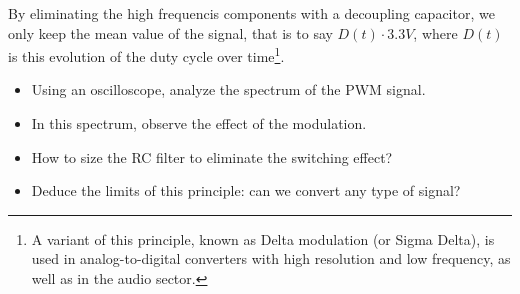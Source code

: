 \documentclass[11pt,a4paper]{article}
\theoremstyle{definition}%
\begin{document}
By eliminating the high frequencis components with a decoupling capacitor, we only keep the mean value of the signal, that is to say $D(t) \cdot 3.3V$, where $D(t)$ is this evolution of the duty cycle over time\footnote{A variant of this principle, known as Delta modulation (or Sigma Delta), is used in analog-to-digital converters with high resolution and low frequency, as well as in the audio sector.}.

\begin{itemize}
	\item Using an oscilloscope, analyze the spectrum of the PWM signal.
	\item In this spectrum, observe the effect of the modulation.
	\item How to size the RC filter to eliminate the switching effect?
	\item Deduce the limits of this principle: can we convert any type of signal?
\end{itemize}
\end{document}

